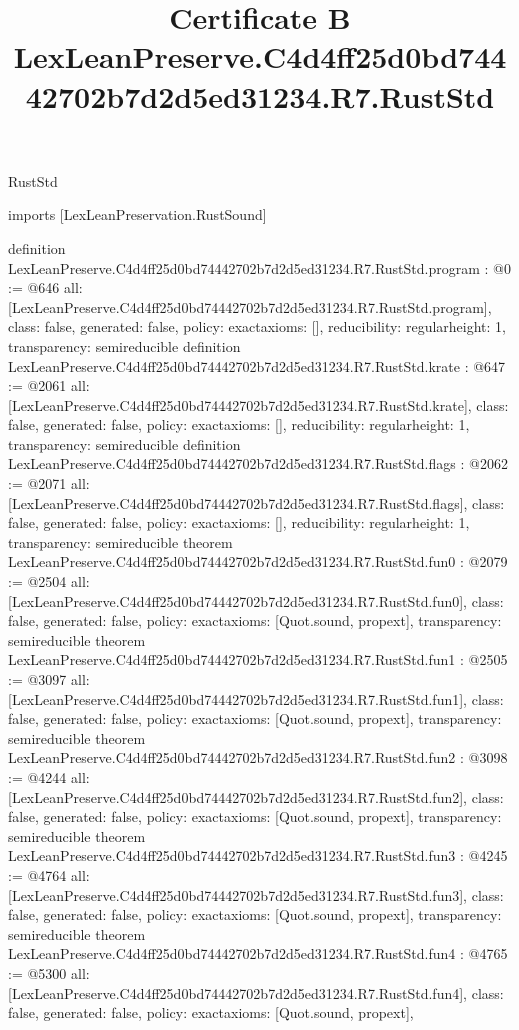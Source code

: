 \begin{lexlean}{RustStd}
\title{Certificate B LexLeanPreserve.C4d4ff25d0bd74442702b7d2d5ed31234.R7.RustStd}
\begin{coremodule}
imports [LexLeanPreservation.RustSound]

definition LexLeanPreserve.C4d4ff25d0bd74442702b7d2d5ed31234.R7.RustStd.program : @0 := @646 {
  all: [LexLeanPreserve.C4d4ff25d0bd74442702b7d2d5ed31234.R7.RustStd.program],
  class: false,
  generated: false,
  policy: exact{axioms: []},
  reducibility: regular{height: 1},
  transparency: semireducible
}
definition LexLeanPreserve.C4d4ff25d0bd74442702b7d2d5ed31234.R7.RustStd.krate : @647 := @2061 {
  all: [LexLeanPreserve.C4d4ff25d0bd74442702b7d2d5ed31234.R7.RustStd.krate],
  class: false,
  generated: false,
  policy: exact{axioms: []},
  reducibility: regular{height: 1},
  transparency: semireducible
}
definition LexLeanPreserve.C4d4ff25d0bd74442702b7d2d5ed31234.R7.RustStd.flags : @2062 := @2071 {
  all: [LexLeanPreserve.C4d4ff25d0bd74442702b7d2d5ed31234.R7.RustStd.flags],
  class: false,
  generated: false,
  policy: exact{axioms: []},
  reducibility: regular{height: 1},
  transparency: semireducible
}
theorem LexLeanPreserve.C4d4ff25d0bd74442702b7d2d5ed31234.R7.RustStd.fun0 : @2079 := @2504 {
  all: [LexLeanPreserve.C4d4ff25d0bd74442702b7d2d5ed31234.R7.RustStd.fun0],
  class: false,
  generated: false,
  policy: exact{axioms: [Quot.sound, propext]},
  transparency: semireducible
}
theorem LexLeanPreserve.C4d4ff25d0bd74442702b7d2d5ed31234.R7.RustStd.fun1 : @2505 := @3097 {
  all: [LexLeanPreserve.C4d4ff25d0bd74442702b7d2d5ed31234.R7.RustStd.fun1],
  class: false,
  generated: false,
  policy: exact{axioms: [Quot.sound, propext]},
  transparency: semireducible
}
theorem LexLeanPreserve.C4d4ff25d0bd74442702b7d2d5ed31234.R7.RustStd.fun2 : @3098 := @4244 {
  all: [LexLeanPreserve.C4d4ff25d0bd74442702b7d2d5ed31234.R7.RustStd.fun2],
  class: false,
  generated: false,
  policy: exact{axioms: [Quot.sound, propext]},
  transparency: semireducible
}
theorem LexLeanPreserve.C4d4ff25d0bd74442702b7d2d5ed31234.R7.RustStd.fun3 : @4245 := @4764 {
  all: [LexLeanPreserve.C4d4ff25d0bd74442702b7d2d5ed31234.R7.RustStd.fun3],
  class: false,
  generated: false,
  policy: exact{axioms: [Quot.sound, propext]},
  transparency: semireducible
}
theorem LexLeanPreserve.C4d4ff25d0bd74442702b7d2d5ed31234.R7.RustStd.fun4 : @4765 := @5300 {
  all: [LexLeanPreserve.C4d4ff25d0bd74442702b7d2d5ed31234.R7.RustStd.fun4],
  class: false,
  generated: false,
  policy: exact{axioms: [Quot.sound, propext]},
}
\end{coremodule}
\end{lexlean}
